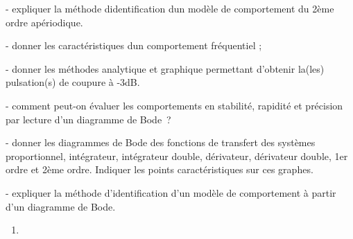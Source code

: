 - expliquer la méthode d\textquotesingle identification d\textquotesingle un modèle de comportement du 2ème ordre apériodique.

- donner les caractéristiques d\textquotesingle un comportement fréquentiel ;

- donner les méthodes analytique et graphique permettant d'obtenir la(les) pulsation(s) de coupure à -3dB.

- comment peut-on évaluer les comportements en stabilité, rapidité et précision par lecture d'un diagramme de Bode~?

- donner les diagrammes de Bode des fonctions de transfert des systèmes proportionnel, intégrateur, intégrateur double, dérivateur, dérivateur double, 1er ordre et 2ème ordre. Indiquer les points caractéristiques sur ces graphes.

- expliquer la méthode d'identification d'un modèle de comportement à partir d'un diagramme de Bode.

\begin{enumerate}
\tightlist
\item
\end{enumerate}
